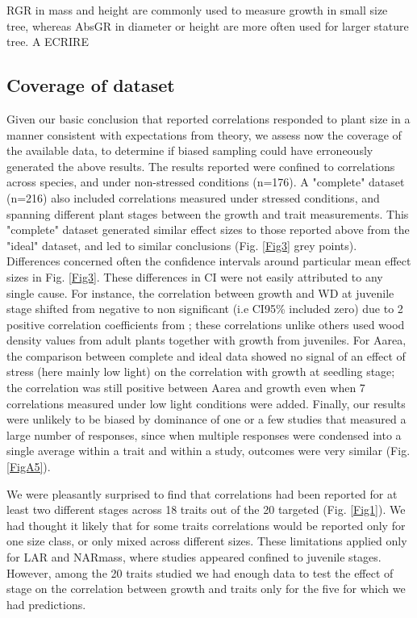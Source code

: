 \documentclass[a4paper]{article}\usepackage[]{graphicx}\usepackage[]{color}
\begin{document}
RGR in mass and height are commonly used to measure growth in small size tree, whereas AbsGR in diameter or height are more often used for larger stature tree. A ECRIRE

\subsection*{Coverage of dataset}

Given our basic conclusion that reported correlations responded to plant size in a manner consistent with expectations from theory, we assess now the coverage of the available data, to determine if biased sampling could have erroneously generated the above results. The results reported were confined to correlations across species, and under non-stressed conditions (n=176). A "complete" dataset (n=216) also included correlations measured under stressed conditions, and spanning different plant stages between the growth and trait measurements. This "complete" dataset generated similar effect sizes to those reported above from the "ideal" dataset, and led to similar conclusions (Fig. \ref{Fig3} grey points). Differences concerned often the confidence intervals around particular mean effect sizes in Fig. \ref{Fig3}. These differences in CI were not easily attributed to any single cause. For instance, the correlation between growth and WD at juvenile stage shifted from negative to non significant (i.e CI95\% included zero) due to 2 positive correlation coefficients from \citet{Augspurger:1984ct};  these correlations unlike others used wood density values from adult plants together with growth from juveniles. For Aarea, the comparison between complete and ideal data showed no signal of an effect of stress (here mainly low light) on the correlation with growth at seedling stage; the correlation was still positive between Aarea and growth even when 7 correlations measured under low light conditions were added. Finally, our results were unlikely to be biased by dominance of one or a few studies that measured a large number of responses, since when multiple responses were condensed into a single average within a trait and within a study, outcomes were very similar (Fig. \ref{FigA5}).

We were pleasantly surprised to find that correlations had been reported for at least two different stages across 18 traits out of the 20 targeted (Fig. \ref{Fig1}). We had thought it likely that for some traits correlations would be reported only for one size class, or only mixed across different sizes. These limitations applied only for LAR and NARmass, where studies appeared confined to juvenile stages. However, among the 20 traits studied we had enough data to test the effect of stage on the correlation between growth and traits only for the five for which we had predictions. 
\end{document}
